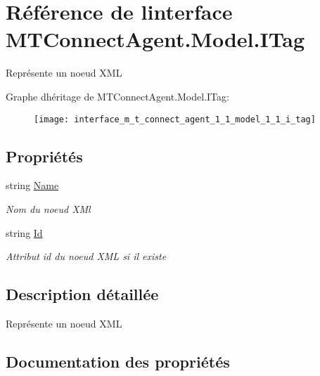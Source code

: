 \hypertarget{interface_m_t_connect_agent_1_1_model_1_1_i_tag}{}\section{Référence de l\textquotesingle{}interface M\+T\+Connect\+Agent.\+Model.\+I\+Tag}
\label{interface_m_t_connect_agent_1_1_model_1_1_i_tag}


Représente un noeud X\+ML  


Graphe d\textquotesingle{}héritage de M\+T\+Connect\+Agent.\+Model.\+I\+Tag\+:\begin{figure}[H]
\begin{center}
\leavevmode
\texttt{[image: interface\_m\_t\_connect\_agent\_1\_1\_model\_1\_1\_i\_tag]}
\end{center}
\end{figure}
\subsection*{Propriétés}
\begin{DoxyCompactItemize}
\item 
string \mbox{\hyperlink{interface_m_t_connect_agent_1_1_model_1_1_i_tag_abb69a3ec05f4a38736a69571c13eb6e8}{Name}}
\begin{DoxyCompactList}\small\item\em Nom du noeud X\+Ml \end{DoxyCompactList}\item 
string \mbox{\hyperlink{interface_m_t_connect_agent_1_1_model_1_1_i_tag_a8f781ac29930451b3cb44b174cde3e4e}{Id}}
\begin{DoxyCompactList}\small\item\em Attribut id du noeud X\+ML si il existe \end{DoxyCompactList}\end{DoxyCompactItemize}


\subsection{Description détaillée}
Représente un noeud X\+ML 



\subsection{Documentation des propriétés}
\mbox{\label{interface_m_t_connect_agent_1_1_model_1_1_i_tag_a8f781ac29930451b3cb44b174cde3e4e}} 

